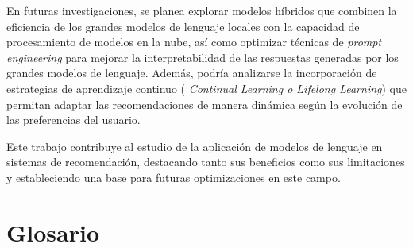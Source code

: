 \documentclass[11pt,a4paper,twoside]{thesis}
\begin{document}
En futuras investigaciones, se planea explorar modelos híbridos que combinen la eficiencia de los grandes modelos de lenguaje  locales con la capacidad de procesamiento de modelos en la nube, así como optimizar técnicas de \textit{prompt engineering} para mejorar la interpretabilidad de las respuestas generadas por los grandes modelos de lenguaje. Además, podría analizarse la incorporación de estrategias de aprendizaje continuo (\textit{ Continual Learning o Lifelong Learning}) que permitan adaptar las recomendaciones de manera dinámica según la evolución de las preferencias del usuario.

Este trabajo contribuye al estudio de la aplicación de modelos de lenguaje en sistemas de recomendación, destacando tanto sus beneficios como sus limitaciones y estableciendo una base para futuras optimizaciones en este campo.


\chapter{Glosario}
\end{document}
